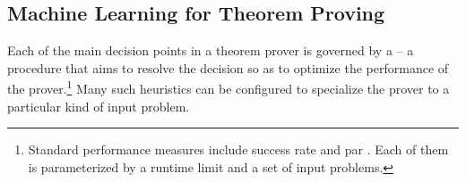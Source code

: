 
\subsection{Machine Learning for Theorem Proving}




Each of the main decision points in a theorem prover is governed by a  -- a procedure that aims to resolve the decision so as to optimize the performance of the prover.\footnote{Standard performance measures include success rate and \gls{par} \cite{DBLP:journals/ai/BischlKKLMFHHLT16}. Each of them is parameterized by a runtime limit and a set of input problems.}
Many such heuristics can be configured to specialize the prover to a particular kind of input problem.

